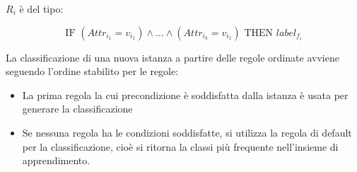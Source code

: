 $R_i$ è del tipo:

$$
\text{IF } (Attr_{i_1} = v_{i_1}) \wedge \ldots \wedge (Attr_{i_k} = v_{i_1}) \text{ THEN } label_{f_i}
$$

La classificazione di una nuova istanza a partire delle regole
ordinate avviene seguendo l'ordine stabilito per le regole:

\begin{itemize}
\item
  La prima regola la cui precondizione è soddisfatta dalla istanza è
  usata per generare la classificazione
\item
  Se nessuna regola ha le condizioni soddisfatte, si utilizza la regola
  di default per la classificazione, cioè si ritorna la classi più
  frequente nell'insieme di apprendimento.
\end{itemize}
